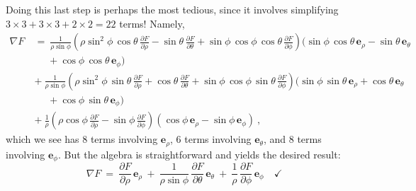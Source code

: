 Doing this last step is perhaps the most tedious, since it involves simplifying $3 \times 3 + 3 \times 3 + 2 \times
2 = 22$ terms! Namely,
\begin{align*}
 \nabla F ~&=~ \frac{1}{\rho\sin\phi}\left( \rho\sin^2\phi\,\cos\theta\,
  \frac{\partial F}{\partial \rho} - \sin\theta\,\frac{\partial F}{\partial \theta} + \sin\phi\,\cos\phi\,\cos\theta\,
  \frac{\partial F}{\partial \phi} \right) (\sin\phi\,\cos\theta\,\mathbf{e}_{\rho} - \sin\theta\,\mathbf{e}_{\theta}\\
  &\mathrel{\phantom{=}} {} + \cos\phi\,\cos\theta\,\mathbf{e}_{\phi})\\
  &+~ \frac{1}{\rho\sin\phi}\left( \rho\sin^2\phi\,\sin\theta\,
  \frac{\partial F}{\partial \rho} + \cos\theta\,\frac{\partial F}{\partial \theta} + \sin\phi\,\cos\phi\,\sin\theta\,
  \frac{\partial F}{\partial \phi} \right) (\sin\phi\,\sin\theta\,\mathbf{e}_{\rho} + \cos\theta\,\mathbf{e}_{\theta}\\
  &\mathrel{\phantom{=}} {} + \cos\phi\,\sin\theta\,\mathbf{e}_{\phi})\\
  &+~ \frac{1}{\rho}\left( \rho\cos\phi\,\frac{\partial F}{\partial \rho} -
  \sin\phi\,\frac{\partial F}{\partial \phi} \right) (\cos\phi\,\mathbf{e}_{\rho} - \sin\phi\,\mathbf{e}_{\phi}) ~,
\end{align*}
which we see has $8$ terms involving $\mathbf{e}_{\rho}$, $6$ terms involving $\mathbf{e}_{\theta}$, and
$8$ terms involving $\mathbf{e}_{\phi}$. But the algebra is straightforward and yields the desired result:
\begin{displaymath}
 \nabla F ~=~ \frac{\partial F}{\partial \rho}\,\mathbf{e}_{\rho} ~+~
  \frac{1}{\rho \sin \phi}\,\frac{\partial F}{\partial \theta}\,\mathbf{e}_{\theta} ~+~
  \frac{1}{\rho}\,\frac{\partial F}{\partial \phi}\,\mathbf{e}_{\phi} \quad\checkmark
\end{displaymath}

